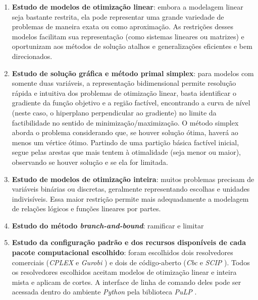 \documentclass[]{article}
\newcommand{ \solver }[1]{\textit{#1}}
\newcommand{ \python }[1]{\textit{#1}}
\begin{document}
		\begin{enumerate}
			
			\item \textbf{Estudo de modelos de otimização linear}:
				embora a modelagem linear seja bastante restrita, ela pode representar uma grande variedade de problemas de maneira exata ou como aproximação. 
				As restrições desses modelos facilitam sua representação (como sistemas lineares ou matrizes) e oportunizam aos métodos de solução atalhos e generalizações eficientes e bem direcionados.
				
			\item \textbf{Estudo de solução gráfica e método primal simplex}:
				para modelos com somente duas variáveis, a representação bidimensional permite resolução rápida e intuitiva dos problemas de otimização linear, basta identificar o gradiente da função objetivo e a região factível, encontrando a curva de nível (neste caso, o hiperplano perpendicular ao gradiente) no limite da factibilidade no sentido de minimização/maximização. 
				O método simplex aborda o problema considerando que, se houver solução ótima, haverá ao menos um vértice ótimo. Partindo de uma partição básica factível inicial, segue pelas arestas que mais tentem à otimalidade (seja menor ou maior), observando se houver solução e se ela for limitada. 
				
			\item \textbf{Estudo de modelos de otimização inteira}:
				muitos problemas precisam de variáveis binárias ou discretas, geralmente representando escolhas e unidades indivisíveis. 
				Essa maior restrição permite mais adequadamente a modelagem de relações lógicos e funções lineares por partes. 
				
			\item \textbf{Estudo do método \textit{branch-and-bound}}:
				ramificar e limitar
				
			\item \textbf{Estudo da configuração padrão e dos recursos disponíveis de cada pacote computacional escolhido}: 
				foram escolhidos dois resolvedores comerciais (\solver{CPLEX} \cite{CPLEX} e \solver{Gurobi} \cite{Gurobi}) e dois de código-aberto (\solver{Cbc} \cite{Cbc} e \solver{SCIP} \cite{SCIP}).
				Todos os resolvedores escolhidos aceitam modelos de otimização linear e inteira mista e aplicam de cortes. 
				A interface de linha de comando deles pode ser acessada dentro do ambiente \python{Python} \cite{Python} pela biblioteca \python{PuLP} \cite{PuLP}.
				

\end{enumerate}
\end{document}
